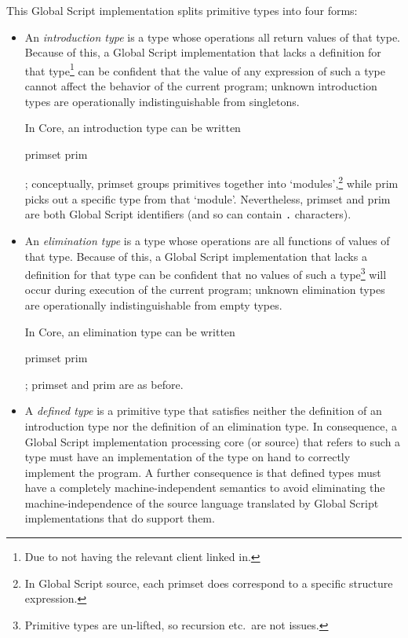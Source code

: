 \documentclass{article}
\newcommand\defn[1]{\emph{#1}}
\newcommand\crkwd[1]{\hskwd{"#1}}
\newcommand\primintrtype{\crkwd{primintrtype}}
\newcommand\primelimtype{\crkwd{primelimtype}}
\begin{document}
This Global Script implementation splits primitive types into four forms:
\begin{itemize}
    \item An \defn{introduction type} is a type whose operations all return values of that type.
        Because of this, a Global Script implementation that lacks a definition for that type\footnote{Due to not having the relevant client linked in.}
        can be confident that the value of any expression of such a type cannot affect the behavior of the current program;
        unknown introduction types are operationally indistinguishable from singletons.

        In Core, an introduction type can be written
        \begin{haskell} \primintrtype primset prim \end{haskell};
        conceptually, \<primset\> groups primitives together into `modules',\footnote{In Global Script source, each primset does correspond to a specific structure expression.}
        while \<prim\> picks out a specific type from that `module'.
        Nevertheless, \<primset\> and \<prim\> are both Global Script identifiers (and so can contain \verb+.+ characters).

    \item An \defn{elimination type} is a type whose operations are all functions of values of that type.
        Because of this, a Global Script implementation that lacks a definition for that type
        can be confident that no values of such a type\footnote{Primitive types are un-lifted, so recursion etc.~are not issues.} will occur during execution of the current program;
        unknown elimination types are operationally indistinguishable from empty types.

        In Core, an elimination type can be written
        \begin{haskell} \primelimtype primset prim \end{haskell};
        \<primset\> and \<prim\> are as before.

    \item A \defn{defined type} is a primitive type that satisfies neither the definition of an introduction type nor the definition of an elimination type.
        In consequence, a Global Script implementation processing core (or source) that refers to such a type must have an implementation of the type on hand to correctly implement the program.
        A further consequence is that defined types must have a completely machine-independent semantics to avoid eliminating the machine-independence of the source language translated by Global Script implementations that do support them.


\end{itemize}
\end{document}
